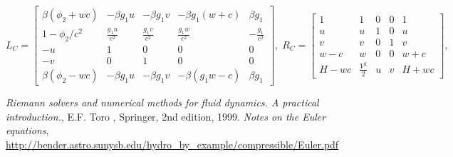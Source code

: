\documentclass{article}
\begin{document}
\begin{equation}
  L_C=\left[
    \begin{array}{ccccc}
      \beta(\phi_2 + w c) & -\beta g_1 u & -\beta g_1 v & -\beta g_1 (w  + c) & \beta g_1 \\
      1 - \phi_2/c^2     & \frac{g_1 u}{c^2}   & \frac{g_1 v}{c^2} & \frac{g_1 w}{c^2} & -\frac{g_1}{c^2}\\
      -u & 1 & 0 & 0 & 0\\
      -v & 0 & 1 & 0 & 0\\
      \beta(\phi_2 - w c) & -\beta g_1 u & -\beta g_1 v & -\beta (g_1 w - c) & \beta g_1
    \end{array}
  \right],\;
  R_C=\left[
    \begin{array}{ccccc}
      1    & 1             & 0 & 0 & 1\\
      u    & u             & 1 & 0 & u\\
      v    & v             & 0 & 1 & v\\
      w-c  & w             & 0 & 0 & w+c\\
      H-wc & \frac{V^2}{2} & u & v & H+wc
    \end{array}
  \right],
\end{equation}

\begin{thebibliography}{9}
 \emph{Riemann solvers and numerical methods for fluid dynamics. A practical introduction.}, E.F. Toro , Springer, 2nd edition, 1999.
 \emph{Notes on the Euler equations}, \url{http://bender.astro.sunysb.edu/hydro_by_example/compressible/Euler.pdf}
\end{thebibliography}
\end{document}

